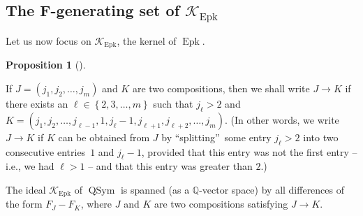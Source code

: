 \documentclass[numbers=enddot,12pt,final,onecolumn,notitlepage]{scrartcl}%
\theoremstyle{definition}
\newtheorem{prop}[theo]{Proposition}
\newenvironment{proposition}[1][]
{\begin{prop}[#1]\begin{leftbar}}
{\end{leftbar}\end{prop}}
\begin{document}
\subsection{The F-generating set of $\mathcal{K}_{\operatorname*{Epk}}$}

Let us now focus on $\mathcal{K}_{\operatorname*{Epk}}$, the kernel of
$\operatorname*{Epk}$.

\begin{proposition}
\label{prop.K.Epk.F}If $J=\left(  j_{1},j_{2},\ldots,j_{m}\right)  $ and $K$
are two compositions, then we shall write $J\rightarrow K$ if there exists an
$\ell\in\left\{  2,3,\ldots,m\right\}  $ such that $j_{\ell}>2$ and $K=\left(
j_{1},j_{2},\ldots,j_{\ell-1},1,j_{\ell}-1,j_{\ell+1},j_{\ell+2},\ldots
,j_{m}\right)  $. (In other words, we write $J\rightarrow K$ if $K$ can be
obtained from $J$ by \textquotedblleft splitting\textquotedblright\ some entry
$j_{\ell}>2$ into two consecutive entries\footnotemark\ $1$ and $j_{\ell}-1$,
provided that this entry was not the first entry -- i.e., we had $\ell>1$ --
and that this entry was greater than $2$.)

The ideal $\mathcal{K}_{\operatorname*{Epk}}$ of $\operatorname*{QSym}$ is
spanned (as a $\mathbb{Q}$-vector space) by all differences of the form
$F_{J}-F_{K}$, where $J$ and $K$ are two compositions satisfying $J\rightarrow
K$.
\end{proposition}

\end{document}
